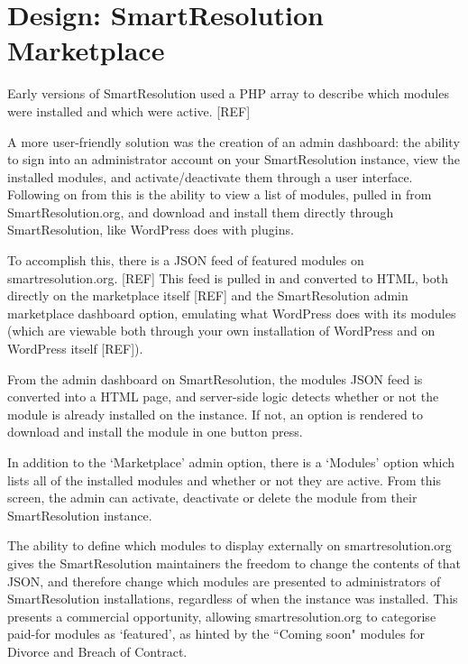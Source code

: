 \section{Design: SmartResolution Marketplace}

Early versions of SmartResolution used a PHP array to describe which modules were installed and which were active. [REF] %

A more user-friendly solution was the creation of an admin dashboard: the ability to sign into an administrator account on your SmartResolution instance, view the installed modules, and activate/deactivate them through a user interface. Following on from this is the ability to view a list of modules, pulled in from SmartResolution.org, and download and install them directly through SmartResolution, like WordPress does with plugins.

To accomplish this, there is a JSON feed of featured modules on smartresolution.org. [REF] This feed is pulled in and converted to HTML, both directly on the marketplace itself [REF] and the SmartResolution admin marketplace dashboard option, emulating what WordPress does with its modules (which are viewable both through your own installation of WordPress and on WordPress itself [REF]). %

From the admin dashboard on SmartResolution, the modules JSON feed is converted into a HTML page, and server-side logic detects whether or not the module is already installed on the instance. If not, an option is rendered to download and install the module in one button press.

In addition to the `Marketplace' admin option, there is a `Modules' option which lists all of the installed modules and whether or not they are active. From this screen, the admin can activate, deactivate or delete the module from their SmartResolution instance.

The ability to define which modules to display externally on smartresolution.org gives the SmartResolution maintainers the freedom to change the contents of that JSON, and therefore change which modules are presented to administrators of SmartResolution installations, regardless of when the instance was installed. This presents a commercial opportunity, allowing smartresolution.org to categorise paid-for modules as `featured', as hinted by the ``Coming soon" modules for Divorce and Breach of Contract.

